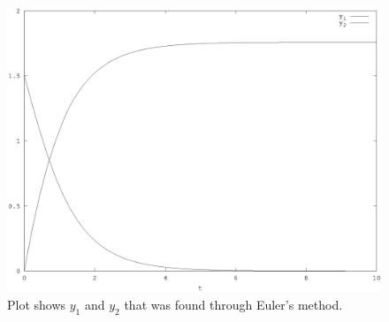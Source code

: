 \documentclass[00-main.tex]{subfiles}
\begin{document}
\begin{figure}
\includegraphics[width=\textwidth]{euler_plot}
\caption{Plot shows $y_1$ and $y_2$ that was found through Euler's method.}
\end{figure}


\end{document}
